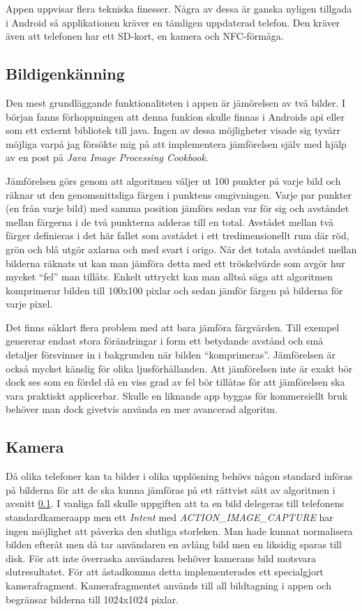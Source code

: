 \documentclass[11px, a4paper]{article}
\begin{document}
	Appen uppvisar flera tekniska finesser. Några av dessa är ganska nyligen tillgada i Android så applikationen kräver en tämligen uppdaterad telefon. Den kräver även att telefonen har ett SD-kort, en kamera och NFC-förmåga.

\subsection{Bildigenkänning}
\label{subsec:image_recog}
	Den mest grundläggande funktionaliteten i appen är jämörelsen av två bilder. I början fanns förhoppningen att denna funkion skulle finnas i Androids api eller som ett externt bibliotek till java. Ingen av dessa möjligheter visade sig tyvärr möjliga varpå jag försökte mig på att implementera jämförelsen själv med hjälp av en post på \emph{Java Image Processing Cookbook}\cite{ImageComparison}.

	Jämförelsen görs genom att algoritmen väljer ut 100 punkter på varje bild och räknar ut den genomsnittsliga färgen i punktens omgivningen. Varje par punkter (en från varje bild) med samma position jämförs sedan var för sig och avståndet mellan färgerna i de två punkterna adderas till en total. Avstådet mellan två färger definieras i det här fallet som avstådet i ett tredimensionellt rum där röd, grön och blå utgör axlarna och med svart i origo. När det totala avståndet mellan bilderna räknats ut kan man jämföra detta med ett tröskelvärde som avgör hur mycket ``fel'' man tillåts. Enkelt uttryckt kan man alltså säga att algoritmen komprimerar bilden till 100x100 pixlar och sedan jämför färgen på bilderna för varje pixel.

	Det finns såklart flera problem med att bara jämföra färgvärden. Till exempel genererar endast stora förändringar i form ett betydande avstånd och små detaljer försvinner in i bakgrunden när bilden ``komprimeras''. Jämförelsen är också mycket känslig för olika ljusförhållanden. Att jämförelsen inte är exakt bör dock ses som en fördel då en viss grad av fel bör tillåtas för att jämförelsen ska vara praktiskt applicerbar. Skulle en liknande app byggas för kommersiellt bruk behöver man dock givetvis använda en mer avancerad algoritm.

\subsection{Kamera}
\label{subsec:camera}
	Då olika telefoner kan ta bilder i olika upplösning behövs någon standard införas på bilderna för att de ska kunna jämföras på ett rättvist sätt av algoritmen i avsnitt \ref{subsec:image_recog}. I vanliga fall skulle uppgiften att ta en bild delegeras till telefonens standardkameraapp men ett \emph{Intent} med \emph{ACTION\_IMAGE\_CAPTURE} har ingen möjlighet att påverka den slutliga storleken. Man hade kunnat normalisera bilden efteråt men då tar användaren en avlång bild men en liksidig sparas till disk. För att inte överraska användaren behöver kamerans bild motsvara slutresultatet. För att åstadkomma detta implementerades ett specialgjort kamerafragment. Kamerafragmentet används till all bildtagning i appen och begränsar bilderna till 1024x1024 pixlar.
\end{document}
